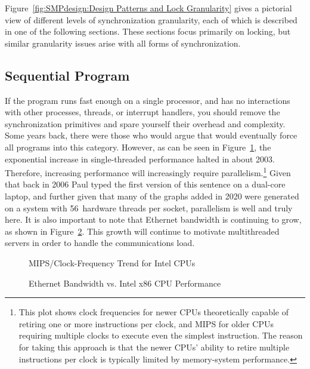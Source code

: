 Figure~\ref{fig:SMPdesign:Design Patterns and Lock Granularity}
gives a pictorial view of different levels of synchronization granularity,
each of which is described in one of the following sections.
These sections focus primarily on locking, but similar granularity
issues arise with all forms of synchronization.

\subsection{Sequential Program}
\label{sec:SMPdesign:Sequential Program}

If the program runs fast enough on a single processor, and
has no interactions with other processes, threads, or interrupt
handlers, you should
remove the synchronization primitives and spare yourself their
overhead and complexity.
Some years back, there were those who would argue that 
would eventually force all programs into this category.
However, as can be seen in
Figure~\ref{fig:SMPdesign:Clock-Frequency Trend for Intel CPUs},
the exponential increase in single-threaded performance halted in
about 2003.
Therefore,
increasing performance will increasingly require parallelism.\footnote{
	This plot shows clock frequencies for newer CPUs theoretically
	capable of retiring one or more instructions per clock, and MIPS for
	older CPUs requiring multiple clocks to execute even the
	simplest instruction.
	The reason for taking this approach is that the newer CPUs'
	ability to retire multiple instructions per clock is typically
	limited by memory-system performance.}
Given that back in 2006 Paul typed the first version of this sentence
on a dual-core laptop, and further given that many of the graphs added
in 2020 were generated on a system with 56~hardware threads per socket,
parallelism is well and truly here.
It is also important to note that Ethernet bandwidth is continuing to
grow, as shown in
Figure~\ref{fig:SMPdesign:Ethernet Bandwidth vs. Intel x86 CPU Performance}.
This growth will continue to motivate multithreaded servers in order to
handle the communications load.

\begin{figure}[tbp]
\centering
{}
\caption{MIPS/Clock-Frequency Trend for Intel CPUs}
\label{fig:SMPdesign:Clock-Frequency Trend for Intel CPUs}
\end{figure}

\begin{figure}[tbp]
\centering
{}
\caption{Ethernet Bandwidth vs. Intel x86 CPU Performance}
\label{fig:SMPdesign:Ethernet Bandwidth vs. Intel x86 CPU Performance}
\end{figure}

